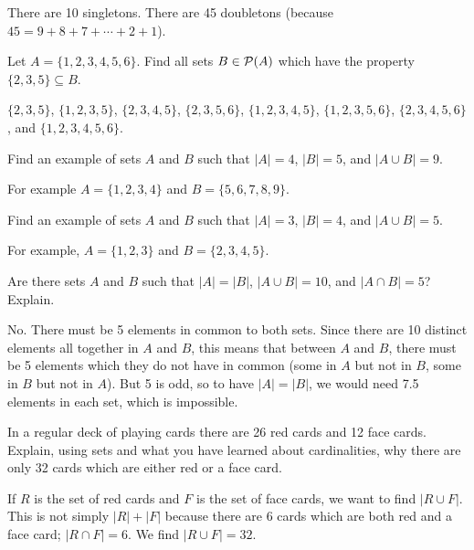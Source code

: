 \begin{questions}
  \begin{answer}
      There are 10 singletons.  There are 45 doubletons (because $45 = 9+8+7+\cdots+2+1$).
  \end{answer}




\question Let $A = \{1,2,3,4,5,6\}$.  Find all sets $B \in \mathcal P(A)$ which have the property $\{2,3,5\} \subseteq B$.

  \begin{answer}
      $\{2,3,5\}$, $\{1,2,3,5\}$, $\{2,3,4,5\}$, $\{2,3,5,6\}$, $\{1,2,3,4,5\}$, $\{1,2,3,5,6\}$, $\{2,3,4,5,6\}$, and $\{1,2,3,4,5,6\}$.
  \end{answer}



\question Find an example of sets $A$ and $B$ such that $|A| = 4$, $|B| = 5$, and $|A \cup B| = 9$.

  \begin{answer}
   For example $A = \{1,2,3,4\}$ and $B = \{5,6,7,8,9\}$.
  \end{answer}




\question Find an example of sets $A$ and $B$ such that $|A| = 3$, $|B| = 4$, and $|A \cup B| = 5$.

  \begin{answer}
    For example, $A = \{1,2,3\}$ and $B = \{2,3,4,5\}$.
  \end{answer}

\question Are there sets $A$ and $B$ such that $|A| = |B|$, $|A\cup B| = 10$, and $|A\cap B| = 5$?  Explain.

	\begin{answer}
	 No.  There must be 5 elements in common to both sets.  Since there are 10 distinct elements all together in $A$ and $B$, this means that between $A$ and $B$, there must be 5 elements which they do not have in common (some in $A$ but not in $B$, some in $B$ but not in $A$).  But 5 is odd, so to have $|A| = |B|$, we would need 7.5 elements in each set, which is impossible.
	\end{answer}

\question In a regular deck of playing cards there are 26 red cards and 12 face cards.  Explain, using sets and what you have learned about cardinalities, why there are only 32 cards which are either red or a face card.

  \begin{answer}
      If $R$ is the set of red cards and $F$ is the set of face cards, we want to find $|R \cup F|$.  This is not simply $|R| + |F|$ because there are 6 cards which are both red and a face card; $|R \cap F| = 6$.  We find $|R \cup F| = 32$.
  \end{answer}


\end{questions}
